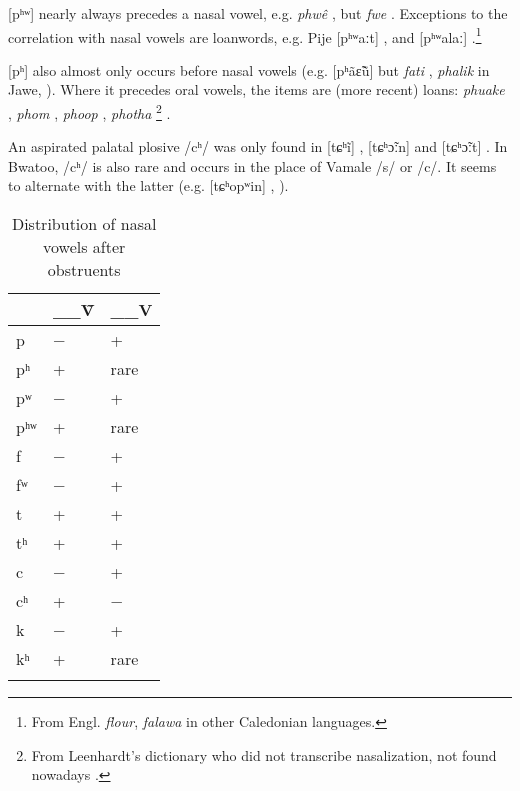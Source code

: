 [pʰʷ] nearly always precedes a nasal vowel, e.g. \textit{phwê} , but \textit{fwe} . Exceptions to the correlation with nasal vowels are loanwords, e.g. Pije [pʰʷaːt] , and [pʰʷalaː] .\footnote{From Engl. \textit{flour}, \textit{falawa} in other Caledonian languages.} 

[pʰ] also almost only occurs before nasal vowels (e.g.  [pʰãɛ̃ũ]  but \textit{fati} , \textit{phalik} in Jawe, \citealt[155]{haudricourt_dictionnaire_1982}). Where it precedes oral vowels, the items are (more recent) loans: \textit{phuake} , \textit{phom} %
, \textit{phoop} , \textit{photha} \footnote{From Leenhardt's dictionary who did not transcribe nasalization, not found nowadays \citeauthor{leenhardt_langues_1946}.} \parencite[516]{rivierre_contact_1994}. %

An aspirated palatal plosive /cʰ/ was only found in [tɕʰĩ] , [tɕʰɔ̃ːn]  and [tɕʰɔ̃ːt] . In Bwatoo, /cʰ/ is also rare and occurs in the place of Vamale /s/ or /c/. It seems to alternate with the latter (e.g. [tɕʰopʷin] \goodtilde [tɕopʷin] , \citealt[119]{rivierre_bwatoo_2006}).


\begin{table}
	\caption{Distribution of nasal vowels after obstruents}
	\begin{tabular}{lll} 	\lsptoprule
		     & \_\_Ṽ & \_\_V\\	\midrule
		 p   & − & +\\
		 pʰ  & + & rare\\
		 pʷ  & − & +\\
		 pʰʷ & + & rare\\
		 f   & − & +\\
		 fʷ  & − & +\\
		 t   & + &+\\
		 tʰ  & + &+\\
		 c   & − & +\\
		 cʰ  & + &−\\
		 k   & − & +\\
		 kʰ  & + &rare\\
		 \lspbottomrule
	\end{tabular}
\label{tab:asp_dist}
\end{table}

